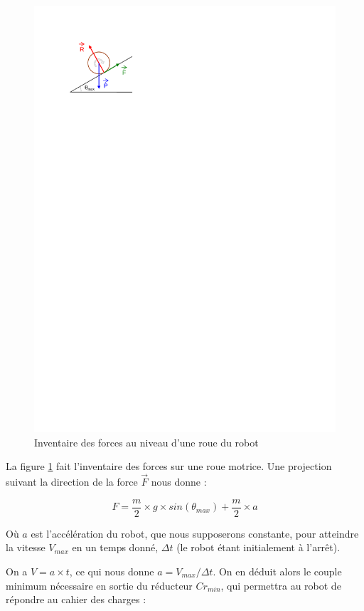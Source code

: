 \documentclass[a4paper]{article}
\begin{document}
\begin{figure}[H]
	\centering
	\includegraphics[scale=1.00]{Images/Inventaire_forces_roue}
	\caption{Inventaire des forces au niveau d'une roue du robot
		\label{Inventaire_forces_roue}}
\end{figure}

La figure \ref{Inventaire_forces_roue} fait l'inventaire des forces sur une roue motrice. Une projection suivant la direction de la force $\vec{F}$ nous donne :

\[F = \frac{m}{2} \times g \times sin(\theta{}_{max}) + \frac{m}{2} \times a\]

Où $a$ est l'accélération du robot, que nous supposerons constante, pour atteindre la vitesse $V_{max}$ en un temps donné, $\Delta t$ (le robot étant initialement à l'arrêt).

On a $V = a \times t$, ce qui nous donne $a = V_{max}/\Delta t$. On en déduit alors le couple minimum nécessaire en sortie du réducteur $Cr_{min}$, qui permettra au robot de répondre au cahier des charges :
\end{document}
